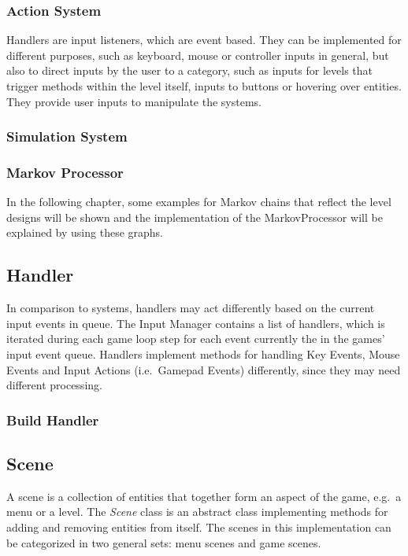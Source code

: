 \subsubsection{Action System}\label{subsubsec:action-system}
Handlers are input listeners, which are event based.
They can be implemented for different purposes, such as keyboard, mouse or controller inputs in general, but also to direct inputs by the user
to a category, such as inputs for levels that trigger methods within the level itself, inputs to buttons or hovering over entities.
They provide user inputs to manipulate the systems. 


\subsubsection{Simulation System}\label{subsubsec:simulation-system}

\subsubsection{Markov Processor}\label{subsubsec:example-markov-chains}
In the following chapter, some examples for Markov chains that reflect the level designs will be shown and the implementation of the
MarkovProcessor will be explained by using these graphs.

\subsection{Handler}\label{subsec:handler}
In comparison to systems, handlers may act differently based on the current input events in queue.
The Input Manager contains a list of handlers, which is iterated during each game loop step for each event currently the in the games' input event queue.
Handlers implement methods for handling Key Events, Mouse Events and Input Actions (i.e.\ Gamepad Events) differently, since they may need different processing.

\subsubsection{Build Handler}\label{subsubsec:build-handler}


\subsection{Scene}\label{subsec:scenes}
A scene is a collection of entities that together form an aspect of the game, e.g.\ a menu or a level.
The \textit{Scene} class is an abstract class implementing methods for adding and removing entities from itself.
The scenes in this implementation can be categorized in two general sets: menu scenes and game scenes.

